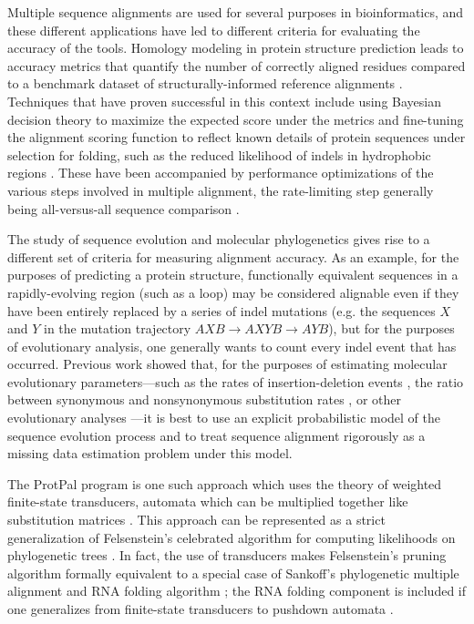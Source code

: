 \documentclass{bioinfo}
\begin{document}
Multiple sequence alignments are used for several purposes in bioinformatics,
and these different applications have led to different criteria for evaluating
the accuracy of the tools.
Homology modeling in protein structure prediction
leads to accuracy metrics that quantify the number of correctly aligned residues
compared to a benchmark dataset of structurally-informed reference alignments \citep{ThompsonEtAl2005}.
Techniques that have proven successful in this context include using Bayesian decision theory to maximize the expected
score under the metrics \citep{NotredameEtAl2000,DoEtAl2005,SchwartzPachter2007,BradleyEtAl2009}
and fine-tuning the alignment scoring function to reflect known details of
protein sequences under selection for folding, such as the reduced likelihood of indels in
hydrophobic regions \citep{KatohEtAl2005,Edgar2004b,LarkinEtAl2007}.
These have been accompanied by performance optimizations of the various steps involved in multiple alignment,
the rate-limiting step generally being all-versus-all sequence comparison \citep{BradleyEtAl2009,Edgar2004b}.

The study of sequence evolution and molecular phylogenetics gives rise to
a different set of criteria for measuring alignment accuracy.
As an example, for the purposes of predicting a protein structure,
functionally equivalent sequences in a rapidly-evolving region (such as a loop)
may be considered alignable even if they have been entirely replaced by a series of indel mutations
(e.g. the sequences $X$ and $Y$ in the mutation trajectory $AXB \to AXYB \to AYB$),
but for the purposes of evolutionary analysis, one generally wants to count every indel event that has occurred.
Previous work showed that, for the purposes of estimating
molecular evolutionary parameters---such as the rates of insertion-deletion events \citep{Westesson2012-zg},
the ratio between synonymous and nonsynonymous substitution rates \citep{Redelings2014},
or other evolutionary analyses \citep{LoytynojaGoldman2008}---it is best to use an explicit probabilistic model of the sequence evolution process
and to treat sequence alignment rigorously as a missing data estimation problem
under this model.

The ProtPal program \citep{Westesson2012-zg} is one such approach which uses the theory of
weighted finite-state transducers,
automata which can be multiplied together like substitution matrices \cite{BouchardCote2013}.
This approach can be represented as a strict generalization of Felsenstein's celebrated
algorithm for computing likelihoods on phylogenetic trees \citep{Felsenstein81}.
In fact, the use of transducers makes Felsenstein's pruning algorithm formally
equivalent to a special case of Sankoff's phylogenetic multiple alignment and RNA folding algorithm \citep{Sankoff85};
the RNA folding component is included if one generalizes from finite-state transducers to pushdown automata \citep{BradleyHolmes2009}.
\end{document}

